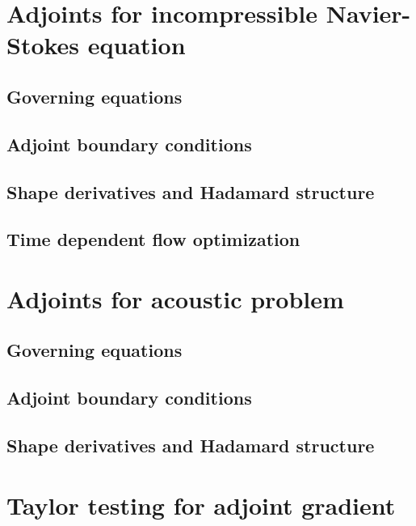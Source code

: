 \section{Adjoints for incompressible Navier-Stokes equation}
\subsection{Governing equations}
\subsection{Adjoint boundary conditions}
\subsection{Shape derivatives and Hadamard structure}
\subsection{Time dependent flow optimization}

\section{Adjoints for acoustic problem}
\subsection{Governing equations}
\subsection{Adjoint boundary conditions}
\subsection{Shape derivatives and Hadamard structure}

\section{Taylor testing for adjoint gradient}
